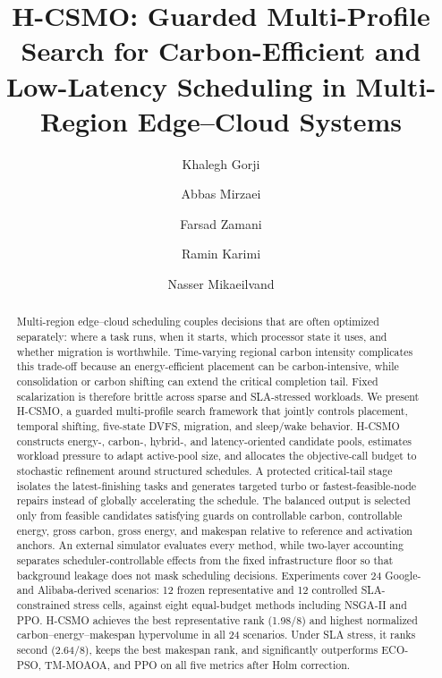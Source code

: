 \documentclass[preprint,12pt]{elsarticle}
\begin{document}
\begin{frontmatter}

\title{H-CSMO: Guarded Multi-Profile Search for Carbon-Efficient and Low-Latency Scheduling in Multi-Region Edge--Cloud Systems}

\author[1]{Khalegh Gorji}
\author[2]{Abbas Mirzaei}
\author[1]{Farsad Zamani}
\author[3]{Ramin Karimi}
\author[4]{Nasser Mikaeilvand}

\address[1]{Department of Computer Engineering, South Tehran Branch, Islamic Azad University, Tehran, Iran}
\address[2]{Department of Computer Engineering, Ardabil Branch, Islamic Azad University, Ardabil, Iran}
\address[3]{Department of Computer Engineering, Shahr-e Qods Branch, Islamic Azad University, Shahr-e Qods, Iran}
\address[4]{Department of Computer Science and Mathematics, Central Tehran Branch, Islamic Azad University, Tehran, Iran}

\begin{abstract}
Multi-region edge--cloud scheduling couples decisions that are often optimized separately: where a task runs, when it starts, which processor state it uses, and whether migration is worthwhile. Time-varying regional carbon intensity complicates this trade-off because an energy-efficient placement can be carbon-intensive, while consolidation or carbon shifting can extend the critical completion tail. Fixed scalarization is therefore brittle across sparse and SLA-stressed workloads. We present H-CSMO, a guarded multi-profile search framework that jointly controls placement, temporal shifting, five-state DVFS, migration, and sleep/wake behavior. H-CSMO constructs energy-, carbon-, hybrid-, and latency-oriented candidate pools, estimates workload pressure to adapt active-pool size, and allocates the objective-call budget to stochastic refinement around structured schedules. A protected critical-tail stage isolates the latest-finishing tasks and generates targeted turbo or fastest-feasible-node repairs instead of globally accelerating the schedule. The balanced output is selected only from feasible candidates satisfying guards on controllable carbon, controllable energy, gross carbon, gross energy, and makespan relative to reference and activation anchors. An external simulator evaluates every method, while two-layer accounting separates scheduler-controllable effects from the fixed infrastructure floor so that background leakage does not mask scheduling decisions. Experiments cover 24 Google- and Alibaba-derived scenarios: 12 frozen representative and 12 controlled SLA-constrained stress cells, against eight equal-budget methods including NSGA-II and PPO. H-CSMO achieves the best representative rank (1.98/8) and highest normalized carbon--energy--makespan hypervolume in all 24 scenarios. Under SLA stress, it ranks second (2.64/8), keeps the best makespan rank, and significantly outperforms ECO-PSO, TM-MOAOA, and PPO on all five metrics after Holm correction.
\end{abstract}


\end{frontmatter}
\end{document}
